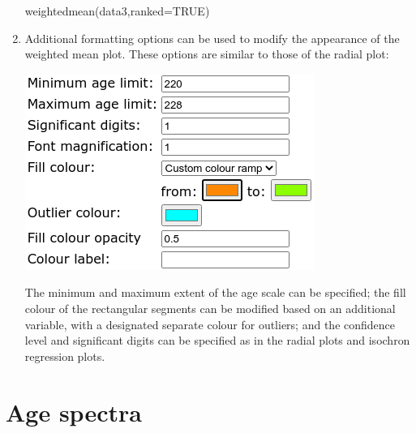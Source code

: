 \begin{refsection}
\begin{enumerate}
\begin{console}
weightedmean(data3,ranked=TRUE)
\end{console}

\item Additional formatting options can be used to modify the
  appearance of the weighted mean plot. These options are similar to
  those of the radial plot:

\noindent\begin{minipage}[t]{.42\linewidth}
\strut\vspace*{-\baselineskip}\newline
  \includegraphics[width=\linewidth]{../figures/OtherWtdMeanRemainingOptions.png}
\end{minipage}
\begin{minipage}[t]{.58\linewidth}
  The minimum and maximum extent of the age scale can be specified;
  the fill colour of the rectangular segments can be modified based on
  an additional variable, with a designated separate colour for
  outliers; and the confidence level and significant digits can be
  specified as in the radial plots and isochron regression plots.
\end{minipage}


\end{enumerate}
 
\section{Age spectra}\label{sec:OtherAgeSpectra}


\end{refsection}
